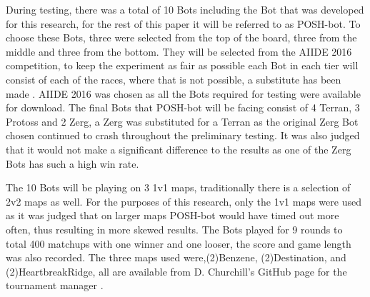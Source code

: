 \documentclass[journal]{IEEEtran}
\begin{document}
	During testing, there was a total of 10 Bots including the Bot that was developed for this research, for the rest of this paper it will be referred to as POSH-bot. To choose these Bots, three were selected from the top of the board, three from the middle and three from the bottom. They will be selected from the AIIDE 2016 competition, to keep the experiment as fair as possible each Bot in each tier will consist of each of the races, where that is not possible, a substitute has been made \cite{2016}. AIIDE 2016 was chosen as all the Bots required for testing were available for download. The final Bots that POSH-bot will be facing consist of 4 Terran, 3 Protoss and 2 Zerg, a Zerg was substituted for a Terran as the original Zerg Bot chosen continued to crash throughout the preliminary testing. It was also judged that it would not make a significant difference to the results as one of the Zerg Bots has such a high win rate.
	
	The 10 Bots will be playing on 3 1v1 maps, traditionally there is a selection of 2v2 maps as well. For the purposes of this research, only the 1v1 maps were used as it was judged that on larger maps POSH-bot would have timed out more often, thus resulting in more skewed results. The Bots played for 9 rounds to total 400 matchups with one winner and one looser, the score and game length was also recorded. The three maps used were,(2)Benzene, (2)Destination, and (2)HeartbreakRidge, all are available from D. Churchill's GitHub page for the tournament manager \cite{Tournament}. 
	
\end{document}
